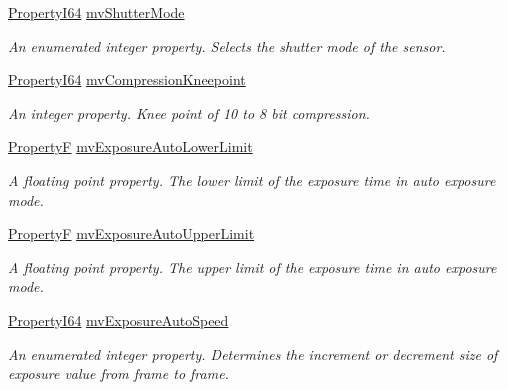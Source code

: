 \begin{DoxyCompactItemize}
\hyperlink{group___common_interface_ga81749b2696755513663492664a18a893}{Property\+I64} \hyperlink{classmv_i_m_p_a_c_t_1_1acquire_1_1_gen_i_cam_1_1_acquisition_control_a1899fb978fe8419e74499c8cb58e1ca8}{mv\+Shutter\+Mode}
\begin{DoxyCompactList}\small\item\em An enumerated integer property. Selects the shutter mode of the sensor. \end{DoxyCompactList}\item 
\hyperlink{group___common_interface_ga81749b2696755513663492664a18a893}{Property\+I64} \hyperlink{classmv_i_m_p_a_c_t_1_1acquire_1_1_gen_i_cam_1_1_acquisition_control_a288bcc77a513f89597531c170e1c88b6}{mv\+Compression\+Kneepoint}
\begin{DoxyCompactList}\small\item\em An integer property. Knee point of 10 to 8 bit compression. \end{DoxyCompactList}\item 
\hyperlink{group___common_interface_gaf54865fe5a3d5cfd15f9a111b40d09f9}{Property\+F} \hyperlink{classmv_i_m_p_a_c_t_1_1acquire_1_1_gen_i_cam_1_1_acquisition_control_a20bae36efd152247f4c1c6766a6a681e}{mv\+Exposure\+Auto\+Lower\+Limit}
\begin{DoxyCompactList}\small\item\em A floating point property. The lower limit of the exposure time in auto exposure mode. \end{DoxyCompactList}\item 
\hyperlink{group___common_interface_gaf54865fe5a3d5cfd15f9a111b40d09f9}{Property\+F} \hyperlink{classmv_i_m_p_a_c_t_1_1acquire_1_1_gen_i_cam_1_1_acquisition_control_a48663b8c79f8184cb8c8f18fbf3a0e32}{mv\+Exposure\+Auto\+Upper\+Limit}
\begin{DoxyCompactList}\small\item\em A floating point property. The upper limit of the exposure time in auto exposure mode. \end{DoxyCompactList}\item 
\hyperlink{group___common_interface_ga81749b2696755513663492664a18a893}{Property\+I64} \hyperlink{classmv_i_m_p_a_c_t_1_1acquire_1_1_gen_i_cam_1_1_acquisition_control_a20d51c921f1bb1f1f13d012fd80a1968}{mv\+Exposure\+Auto\+Speed}
\begin{DoxyCompactList}\small\item\em An enumerated integer property. Determines the increment or decrement size of exposure value from frame to frame. \end{DoxyCompactList}\item 

\end{DoxyCompactItemize}
